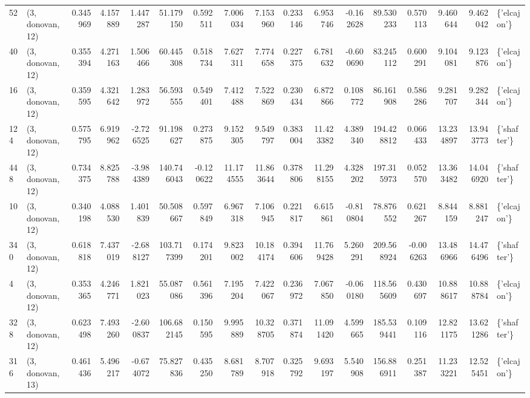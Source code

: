 \begin{tabular}{llrrrrrrrrrrrrrrl}
52  &  (3, donovan, 12) &   0.345969 &   4.157889 &   1.447287 &    51.179150 &   0.592511 &   7.006034 &   7.153960 &  0.233146 &   6.953746 &  -0.162628 &    89.530233 &   0.570113 &   9.460644 &   9.462042 &  \{'elcajon'\} \\
40  &  (3, donovan, 12) &   0.355394 &   4.271163 &   1.506466 &    60.445308 &   0.518734 &   7.627311 &   7.774658 &  0.227375 &   6.781632 &  -0.600690 &    83.245112 &   0.600291 &   9.104081 &   9.123876 &  \{'elcajon'\} \\
16  &  (3, donovan, 12) &   0.359595 &   4.321642 &   1.283972 &    56.593555 &   0.549401 &   7.412488 &   7.522869 &  0.230434 &   6.872866 &   0.108772 &    86.161908 &   0.586286 &   9.281707 &   9.282344 &  \{'elcajon'\} \\
124 &  (3, donovan, 12) &   0.575795 &   6.919962 &  -2.726525 &    91.198627 &   0.273875 &   9.152305 &   9.549797 &  0.383004 &  11.423382 &   4.389340 &   194.428812 &   0.066433 &  13.234897 &  13.943773 &  \{'shafter'\} \\
448 &  (3, donovan, 12) &   0.734375 &   8.825788 &  -3.984389 &   140.746043 &  -0.120622 &  11.174555 &  11.863644 &  0.378806 &  11.298155 &   4.328202 &   197.315973 &   0.052570 &  13.363482 &  14.046920 &  \{'shafter'\} \\
10  &  (3, donovan, 12) &   0.340198 &   4.088530 &   1.401839 &    50.508667 &   0.597849 &   6.967318 &   7.106945 &  0.221817 &   6.615861 &  -0.810804 &    78.876552 &   0.621267 &   8.844159 &   8.881247 &  \{'elcajon'\} \\
340 &  (3, donovan, 12) &   0.618818 &   7.437019 &  -2.688127 &   103.717399 &   0.174201 &   9.823002 &  10.184174 &  0.394606 &  11.769428 &   5.260291 &   209.568924 &  -0.006263 &  13.486966 &  14.476496 &  \{'shafter'\} \\
4   &  (3, donovan, 12) &   0.353365 &   4.246771 &   1.821023 &    55.087086 &   0.561396 &   7.195204 &   7.422067 &  0.236972 &   7.067850 &  -0.060180 &   118.565609 &   0.430697 &  10.888617 &  10.888784 &  \{'elcajon'\} \\
328 &  (3, donovan, 12) &   0.623498 &   7.493260 &  -2.600837 &   106.682145 &   0.150595 &   9.995889 &  10.328705 &  0.371874 &  11.091420 &   4.599665 &   185.539441 &   0.109116 &  12.821175 &  13.621286 &  \{'shafter'\} \\
316 &  (3, donovan, 13) &   0.461436 &   5.496217 &  -0.674072 &    75.827836 &   0.435250 &   8.681789 &   8.707918 &  0.325792 &   9.693197 &   5.540908 &   156.886911 &   0.251387 &  11.233221 &  12.525451 &  \{'elcajon'\} \\

\end{tabular}
